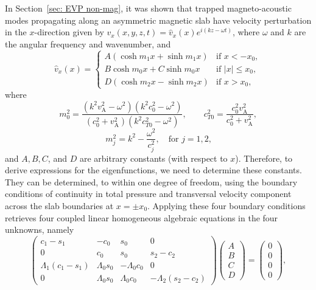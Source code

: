 In Section~\ref{sec: EVP non-mag}, it was shown that trapped magneto-acoustic modes propagating along an asymmetric magnetic slab have velocity perturbation in the $x$-direction given by $v_x(x,y,z,t) = \widehat{v}_x(x)e^{i(kz-\omega t)}$, where $\omega$ and $k$ are the angular frequency and wavenumber, and
\begin{equation}
\hat{v}_x(x)=
\begin{cases}
A(\cosh{m_1x} + \sinh{m_1x}) & \text{if } x < -x_0, \\
B\cosh{m_0x} + C\sinh{m_0x} & \text{if } |x| \leq x_0, \\
D(\cosh{m_2x} - \sinh{m_2x}) & \text{if } x > x_0, \label{vsoln}
\end{cases}
\end{equation}
where
\begin{equation}
m_0^2 = \frac{(k^2v_\textrm{A}^2 - \omega^2)(k^2c_0^2 - \omega^2)}{(c_0^2 + v_\textrm{A}^2)(k^2c_{T0}^2-\omega^2)}, \qquad c_{T0}^2 = \frac{c_0^2v_\textrm{A}^2}{c_0^2 + v_\textrm{A}^2}, \label{m0}
\end{equation}
\begin{equation}
m_j^2 = k^2 - \frac{\omega^2}{c_j^2}, \quad \text{for $j = 1, 2$,} \label{m1,2}
\end{equation}
and $A, B, C$, and $D$ are arbitrary constants (with respect to $x$). Therefore, to derive expressions for the eigenfunctions, we need to determine these constants. They can be determined, to within one degree of freedom, using the boundary conditions of continuity in total pressure and transversal velocity component across the slab boundaries at $x = \pm x_0$. Applying these four boundary conditions retrieves four coupled linear homogeneous algebraic equations in the four unknowns, namely
\begin{equation}
\left(
\begin{matrix}
c_1 - s_1 &-c_0                       &s_0                        &0 \\
0       &c_0                        &s_0                        &s_2 - c_2 \\
\Lambda_1(c_1 - s_1)       &\Lambda_0s_0 &-\Lambda_0c_0  &0 \\
0       &\Lambda_0s_0                          &\Lambda                   _0c_0 &-\Lambda_2(s_2 - c_2)
\end{matrix}
\right)
\left(
\begin{matrix}
A \\
B \\
C \\
D
\end{matrix}
\right)
=
\left(
\begin{matrix}
0 \\
0 \\
0 \\
0
\end{matrix}
\right),
\label{coefmatrix}
\end{equation}
